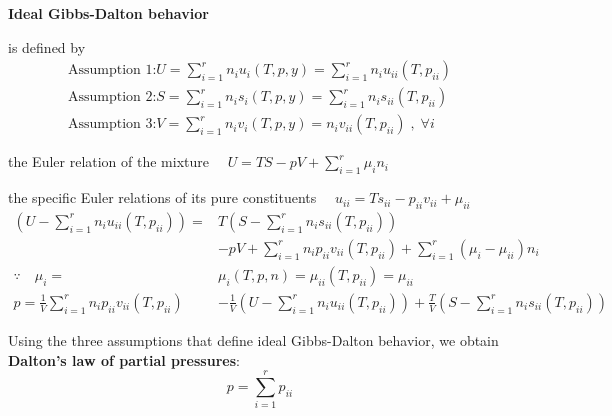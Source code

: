 \begin{example}
    \textbf{Ideal Gibbs-Dalton behavior} 
    
    is defined by
    \begin{gather*}
    \text{Assumption 1:}
    U = \sum_{i=1}^r n_i u_i(T, p, y) = \sum_{i=1}^r n_i u_{ii}(T, p_{ii})
\\
    \text{Assumption 2:}
    S = \sum_{i=1}^r n_i s_i(T, p, y) = \sum_{i=1}^r n_i s_{ii}(T, p_{ii})
\\    
    \text{Assumption 3:}
    V = \sum_{i=1}^r n_i v_i(T, p, y) = n_i v_{ii}(T, p_{ii}) \;,\; \forall i
    \end{gather*}

    the Euler relation of the mixture \(\displaystyle \quad U = TS - pV + \sum_{i=1}^r \mu_i n_i \)

    the specific Euler relations of its pure constituents \(\displaystyle \quad u_{ii} = Ts_{ii} - p_{ii}v_{ii} + \mu_{ii} \)
\begin{align*}
    \left( U - \sum_{i=1}^r n_i u_{ii}(T, p_{ii}) \right) 
    =& T \left( S - \sum_{i=1}^r n_i s_{ii}(T, p_{ii}) \right) \\
&- pV + \sum_{i=1}^r n_i p_{ii} v_{ii}(T, p_{ii}) 
+ \sum_{i=1}^r (\mu_i - \mu_{ii}) n_i\\
\because \quad \mu_i =& \mu_i(T, p, n) = \mu_{ii}(T, p_{ii}) = \mu_{ii}\\
p = \frac{1}{V} \sum_{i=1}^r n_i p_{ii} v_{ii}(T, p_{ii}) 
 &- \frac{1}{V} \left( U - \sum_{i=1}^r n_i u_{ii}(T, p_{ii}) \right)
 + \frac{T}{V} \left( S - \sum_{i=1}^r n_i s_{ii}(T, p_{ii}) \right)
\end{align*}

Using the three assumptions that define ideal Gibbs-Dalton behavior, 
we obtain \textbf{Dalton's law of partial pressures}:
\[
p = \sum_{i=1}^r p_{ii}
\]
\end{example}
